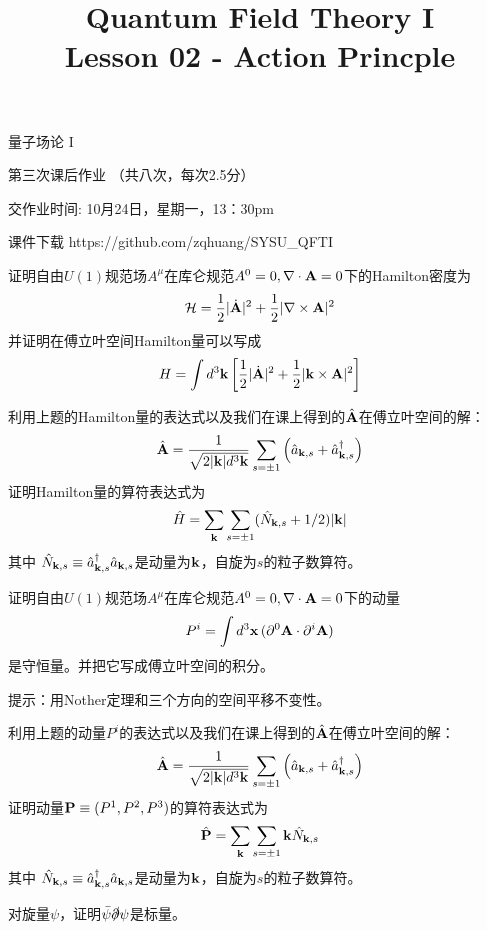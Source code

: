 \documentclass[CJK]{beamer}
\title{Quantum Field Theory I \\ Lesson 02 - Action Princple}
\author{}
\date{}
\begin{document}
\begin{frame}
 
\begin{center}
\begin{Large}
\bch
量子场论 I 

{\vskip 0.3in}

第三次课后作业 （共八次，每次2.5分）

交作业时间: 10月24日，星期一，13：30pm

\ech
\end{Large}
\end{center}

\vskip 0.2in

\bch
课件下载
\ech
https://github.com/zqhuang/SYSU\_QFTI

\end{frame}

\begin{frame}
\bch
证明自由$U(1)$规范场$A^\mu$在库仑规范$A^0=0, \nabla\cdot {\mathbf{A}}=0$下的Hamilton密度为
$${\mathcal{H}} = \frac{1}{2}|\dot{{\mathbf{A}}}|^2 + \frac{1}{2}|\nabla\times {\mathbf{A}}|^2$$
并证明在傅立叶空间Hamilton量可以写成
$$H = \int d^3{\mathbf{k}}\left[\frac{1}{2}|\dot{{\mathbf{A}}}|^2 + \frac{1}{2}|{\mathbf{k}} \times {\mathbf{A}}|^2\right]$$
\ech
\end{frame}

\begin{frame}
\bch
利用上题的Hamilton量的表达式以及我们在课上得到的$\hat{{\mathbf{A}}}$在傅立叶空间的解：
$$\hat{{\mathbf{A}}} = \frac{1}{\sqrt{2|{\mathbf{k}}|d^3{\mathbf{k}}}}\sum_{s=\pm 1} \left({\hat{a}}_{{\mathbf{k}}, s} + {\hat{a}^\dagger}_{{\mathbf{k}}, s}\right)$$
证明Hamilton量的算符表达式为
$$\hat{H} = \sum_{{\mathbf{k}}} \sum_{s=\pm 1}(\hat{N}_{{\mathbf{k}},s}+1/2)|{\mathbf{k}}|$$
其中 $\hat{N}_{{\mathbf{k}}, s} \equiv {\hat{a}^\dagger}_{{\mathbf{k}},s}{\hat{a}}_{{\mathbf{k}}, s}$是动量为${\mathbf{k}}$，自旋为$s$的粒子数算符。
\ech
\end{frame}

\begin{frame}
\bch
证明自由$U(1)$规范场$A^\mu$在库仑规范$A^0=0, \nabla\cdot {\mathbf{A}}=0$下的动量
$$P^i = \int d^3{\mathbf{x}}\, (\partial^0{\mathbf{A}} \cdot \partial^i{\mathbf{A}})$$
是守恒量。并把它写成傅立叶空间的积分。
\skipline
\skipline

提示：用Nother定理和三个方向的空间平移不变性。 
\ech
\end{frame}


\begin{frame}
\bch
利用上题的动量$P^i$的表达式以及我们在课上得到的$\hat{{\mathbf{A}}}$在傅立叶空间的解：
$$\hat{{\mathbf{A}}} = \frac{1}{\sqrt{2|{\mathbf{k}}|d^3{\mathbf{k}}}}\sum_{s=\pm 1} \left({\hat{a}}_{{\mathbf{k}}, s} + {\hat{a}^\dagger}_{{\mathbf{k}}, s}\right)$$
证明动量${\mathbf{P}} \equiv (P^1, P^2, P^3)$的算符表达式为
$$\hat{{\mathbf{P}}} = \sum_{{\mathbf{k}}}\sum_{s = \pm 1} {\mathbf{k}} \hat{N}_{{\mathbf{k}}, s}$$
其中 $\hat{N}_{{\mathbf{k}}, s} \equiv {\hat{a}^\dagger}_{{\mathbf{k}},s}{\hat{a}}_{{\mathbf{k}}, s}$是动量为${\mathbf{k}}$，自旋为$s$的粒子数算符。
\ech
\end{frame}


\begin{frame}
\bch
对旋量$\psi$，证明$\bar\psi\slashed{\partial}\psi$是标量。
\ech
\end{frame}
\end{document}
